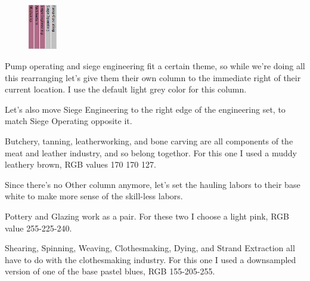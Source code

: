 \documentclass[]{article}
\begin{document}
\begin{figure}
\vspace{-25pt}
  \begin{center}
    \includegraphics[width=0.11\textwidth]{Sec3Fig21}
  \end{center}
\vspace{-15pt}
\end{figure}
Pump operating and siege engineering fit a certain theme, so while we're doing all this rearranging let's
give them their own column to the immediate right of their current location. I use the default light grey
color for this column.
\vspace{12pt}

Let's also move Siege Engineering to the right edge of the engineering set, to match Siege Operating
opposite it.
\vspace{12pt}

Butchery, tanning, leatherworking, and bone carving are all components of the meat and leather industry,
and so belong togethor. For this one I used a muddy leathery brown, RGB values 170 170 127.
\vspace{12pt}

Since there's no Other column anymore, let's set the hauling labors to their base white to make more
sense of the skill-less labors.
\vspace{12pt}

Pottery and Glazing work as a pair. For these two I choose a light pink, RGB value 255-225-240.
\vspace{12pt}

Shearing, Spinning, Weaving, Clothesmaking, Dying, and Strand Extraction all have to do with the
clothesmaking industry. For this one I used a downsampled version of one of the base pastel blues, RGB
155-205-255.
\vspace{12pt}
\end{document}
